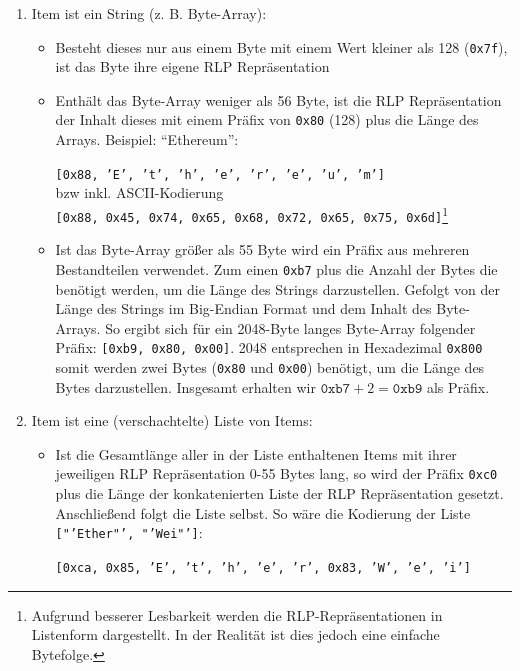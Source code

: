 \documentclass[runningheads]{llncs}
\begin{document}
\begin{enumerate}
  \item Item ist ein String (z. B. Byte-Array):
        \begin{itemize}
          \item Besteht dieses nur aus einem Byte mit einem Wert kleiner als 128 (\texttt{0x7f}), ist das Byte ihre eigene RLP Repräsentation
          \item Enthält das Byte-Array weniger als 56 Byte, ist die RLP Repräsentation der Inhalt dieses mit einem Präfix von \texttt{0x80} (128) plus die Länge des Arrays. Beispiel: "`Ethereum"':
                \begin{center}
                  \texttt{[0x88, 'E', 't', 'h', 'e', 'r', 'e', 'u', 'm']}\\
                  bzw inkl. ASCII-Kodierung\\
                  \texttt{[0x88, 0x45, 0x74, 0x65, 0x68, 0x72, 0x65, 0x75, 0x6d]}\footnote{Aufgrund besserer Lesbarkeit werden die RLP-Repräsentationen in Listenform dargestellt. In der Realität ist dies jedoch eine einfache Bytefolge.}
                \end{center}
          \item Ist das Byte-Array größer als 55 Byte wird ein Präfix aus mehreren Bestandteilen verwendet. Zum einen \texttt{0xb7} plus die Anzahl der Bytes die benötigt werden, um die Länge des Strings darzustellen. Gefolgt von der Länge des Strings im Big-Endian Format und dem Inhalt des Byte-Arrays. So ergibt sich für ein 2048-Byte langes Byte-Array folgender Präfix: \texttt{[0xb9, 0x80, 0x00]}.
                2048 entsprechen in Hexadezimal \texttt{0x800} somit werden zwei Bytes (\texttt{0x80} und \texttt{0x00}) benötigt, um die Länge des Bytes darzustellen. Insgesamt erhalten wir $\texttt{0xb7} + 2 = \texttt{0xb9}$ als Präfix.
        \end{itemize}
  \item Item ist eine (verschachtelte) Liste von Items:
        \begin{itemize}
          \item Ist die Gesamtlänge aller in der Liste enthaltenen Items mit ihrer jeweiligen RLP Repräsentation 0-55 Bytes lang, so wird der Präfix \texttt{0xc0} plus die Länge der konkatenierten Liste der RLP Repräsentation gesetzt. Anschließend folgt die Liste selbst. So wäre die Kodierung der Liste \texttt{["'Ether"', "'Wei"']}:
                \begin{center}
                  \texttt{[0xca, 0x85, 'E', 't', 'h', 'e', 'r', 0x83, 'W', 'e', 'i']}\\

\end{center}
\end{itemize}
\end{enumerate}
\end{document}
